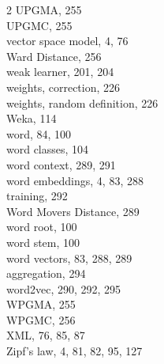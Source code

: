 \documentclass[twoside,11pt]{book}
\begin{document}
\begin{multicols}{2}
UPGMA, 255\\
UPGMC, 255\\
vector space model, 4, 76\\
Ward Distance, 256\\
weak learner, 201, 204\\
weights, correction, 226\\
weights, random definition, 226\\
Weka, 114\\
word, 84, 100\\
word classes, 104\\
word context, 289, 291\\
word embeddings, 4, 83, 288\\
training, 292\\
Word Movers Distance, 289\\
word root, 100\\
word stem, 100\\
word vectors, 83, 288, 289\\
aggregation, 294\\
word2vec, 290, 292, 295\\
WPGMA, 255\\
WPGMC, 256\\
XML, 76, 85, 87\\
Zipf's law, 4, 81, 82, 95, 127
\end{multicols}
\end{document}
